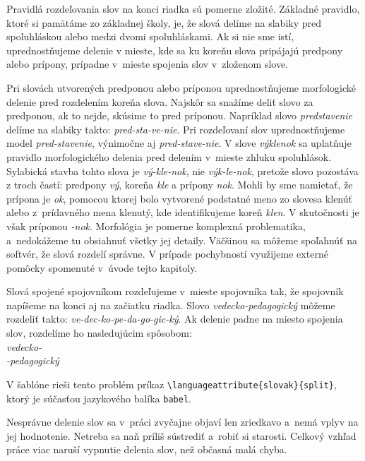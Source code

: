 Pravidlá rozdeľovania slov na konci riadka sú pomerne zložité.
Základné pravidlo, ktoré si pamätáme zo základnej školy,
je, že slová delíme na slabiky pred spoluhláskou alebo medzi
dvomi spoluhláskami.
Ak si nie sme istí, uprednostňujeme delenie v mieste,
kde sa ku koreňu slova pripájajú predpony alebo prípony,
prípadne v~mieste spojenia slov v~zloženom slove.

Pri slovách utvorených predponou alebo príponou
uprednostňujeme morfologické delenie
pred rozdelením koreňa slova.
Najskôr sa snažíme deliť slovo za predponou,
ak to nejde, skúsime to pred príponou.
Napríklad slovo \emph{predstavenie}
delíme na slabiky takto: \emph{pred-sta-ve-nie}.
Pri rozdeľovaní slov uprednostňujeme model
\emph{pred-stavenie}, výnimočne aj \emph{pred-stave-nie}.
V slove \emph{výklenok} sa uplatňuje pravidlo morfologického
delenia pred delením v~mieste zhluku spoluhlások.
Sylabická stavba tohto slova je \emph{vý-kle-nok},
nie \emph{výk-le-nok},
pretože slovo pozostáva z troch častí: predpony \emph{vý},
koreňa \emph{kle} a prípony \emph{nok}.
Mohli by sme namietať, že prípona je \emph{ok},
pomocou ktorej bolo vytvorené podstatné meno zo slovesa
klenúť alebo z~prídavného mena klenutý,
kde identifikujeme koreň \emph{klen}.
V skutočnosti je však príponou \emph{-nok}.
Morfológia je pomerne komplexná problematika,
a~nedokážeme tu obsiahnuť všetky jej detaily.
Väčšinou sa môžeme spoľahnúť na softvér,
že slová rozdelí správne.
V prípade pochybností využijeme externé pomôcky spomenuté
v~úvode tejto kapitoly.

Slová spojené spojovníkom rozdeľujeme v~mieste spojovníka tak,
že spojovník napíšeme na konci aj na začiatku riadka.
Slovo \emph{vedecko-pedagogický} môžeme rozdeliť takto:
\emph{ve-dec-ko-pe-da-go-gic-ký}.
Ak delenie padne na miesto spojenia slov,
rozdelíme ho nasledujúcim spôsobom:\\
\indent\emph{vedecko-}\\
\indent\emph{-pedagogický}

V šablóne rieši tento problém príkaz
\verb|\languageattribute{slovak}{split}|,
ktorý je súčasťou jazykového balíka \verb|babel|.

Nesprávne delenie slov sa v~práci zvyčajne objaví
len zriedkavo a~nemá vplyv na jej hodnotenie.
Netreba sa naň príliš sústrediť a~robiť si starosti.
Celkový vzhľad práce viac naruší vypnutie delenia slov,
než občasná malá chyba.

